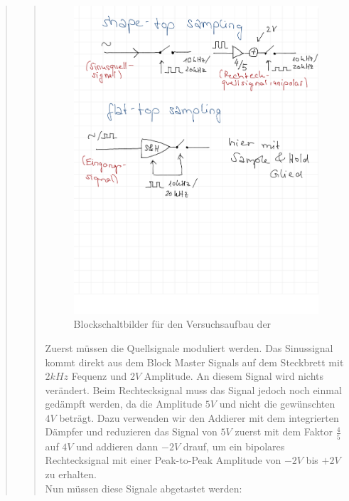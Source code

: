 \begin{quote}
\begin{quote}
        \begin{figure}[H]
            \centering
                \includegraphics[scale=0.3, trim = 0cm 10cm 0cm 0cm,
                clip]{./Bilder/Blockschaltbilder.png}
                    \caption{Blockschaltbilder für den Versuchsaufbau der }
        \end{figure}
        
        Zuerst müssen die Quellsignale moduliert werden. Das Sinussignal
        kommt direkt aus dem Block Master Signals auf dem Steckbrett mit $2 kHz$ Fequenz und
        $2V$ Amplitude. An diesem Signal wird nichts verändert. Beim
        Rechtecksignal muss das Signal jedoch noch einmal gedämpft werden, da die Amplitude $5V$ und nicht die
        gewünschten $4V$ beträgt.
        Dazu verwenden wir den Addierer mit dem integrierten Dämpfer und
        reduzieren das Signal von $5V$ zuerst mit dem Faktor $\frac{4}{5}$ auf $4V$ und addieren dann $-2V$ drauf, um
        ein bipolares Rechtecksignal mit einer Peak-to-Peak Amplitude von $-2V$
        bis $+2V$ zu erhalten.\\
        Nun müssen diese Signale abgetastet werden:
        

\end{quote}
\end{quote}
